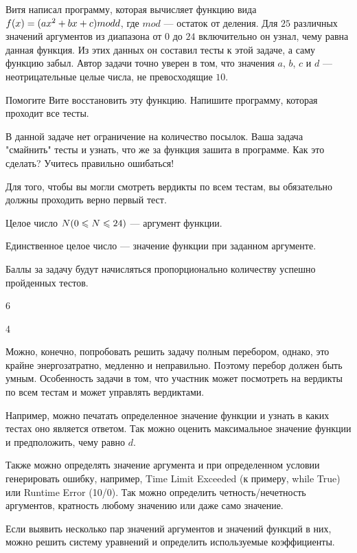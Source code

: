 
Витя написал программу, которая вычисляет функцию вида $f(x)=(ax^2+bx+c)\space mod\space d$, где $mod$ — остаток от деления. 
Для $25$ различных значений аргументов из диапазона от $0$ до $24$ включительно он узнал, чему равна данная функция. Из этих 
данных он составил тесты к этой задаче, а саму функцию забыл. Автор задачи точно уверен в том, что значения $a$, $b$, $c$ и $d$ — 
неотрицательные целые числа, не превосходящие $10$.

Помогите Вите восстановить эту функцию. Напишите программу, которая проходит все тесты.

В данной задаче нет ограничение на количество посылок. Ваша задача "смайнить" тесты и узнать, что же за функция зашита в программе. 
Как это сделать? Учитесь правильно ошибаться! 

Для того, чтобы вы могли смотреть вердикты по всем тестам, вы обязательно должны проходить верно первый тест.


Целое число $N\space(0\leq N\leq24)$  — аргумент функции.

\outputfmtSection

Единственное целое число — значение функции при заданном аргументе.

\markSection

Баллы за задачу будут начисляться пропорционально количеству успешно пройденных тестов.


\begin{myverbbox}[\small]{\vinput}
    6
\end{myverbbox}

\begin{myverbbox}[\small]{\voutput}
    4
\end{myverbbox}

\solutionSection

Можно, конечно, попробовать решить задачу полным перебором, однако, это крайне энергозатратно, медленно и неправильно. Поэтому перебор должен быть умным. Особенность задачи в том, что участник может посмотреть на вердикты по всем тестам и может управлять вердиктами. 

Например, можно печатать определенное значение функции и узнать в каких тестах оно является ответом. Так можно оценить максимальное значение функции и предположить, чему равно $d$.  

Также можно определять значение аргумента и при определенном условии генерировать ошибку, например, Time Limit Exceeded (к примеру, while True) или Runtime Error (10/0). Так можно определить четность/нечетность аргументов, кратность любому значению или даже само значение.

Если выявить несколько пар значений аргументов и значений функций в них, можно решить систему уравнений и определить используемые коэффициенты.

